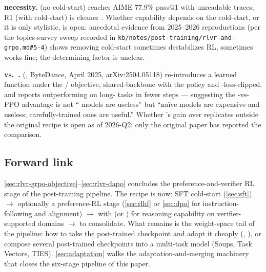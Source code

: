\begin{contradiction}
\textbf{ necessity.}  (no cold-start) reaches AIME
$77.9\%$ pass@1 with unreadable traces; R1 (with cold-start) is cleaner
\citep[\S 3]{deepseek-r1}. Whether capability depends on the
cold-start, or it is only stylistic, is open: anecdotal evidence
from 2025--2026 reproductions (per the topics-survey sweep recorded in
\nolinkurl{kb/notes/post-training/rlvr-and-grpo.md#5-4}) shows removing
cold-start sometimes destabilizes RL, sometimes works fine; the
determining factor is unclear.
\end{contradiction}

\begin{contradiction}
\textbf{ vs.\ .}  (, ByteDance, April
2025, arXiv:2504.05118) re-introduces a learned 
function under the / objective, shared-backbone with the
policy and -loss-clipped, and reports outperforming  on
long- tasks in fewer steps — suggesting the -vs-PPO advantage is
not `` models are useless'' but ``na\"ive  models are
expensive-and-useless; carefully-trained ones are useful.'' Whether
's gain over  replicates outside the original recipe is open as
of 2026-Q2; only the original paper has reported the comparison.
\end{contradiction}

\subsection{Forward link}
\label{sec:rlvr-forward}

\cref{sec:rlvr-grpo-objective}--\cref{sec:rlvr-dapo} concludes the
preference-and-verifier RL stage of the post-training pipeline.
The recipe is now: SFT cold-start (\cref{sec:sft})
$\to$ optionally a preference-RL stage (\cref{sec:rlhf} or
\cref{sec:dpo} for instruction-following and alignment)
$\to$  with  (or ) for reasoning capability on
verifier-supported domains $\to$  to consolidate.
What remains is the weight-space tail of the pipeline: how to take the
post-trained checkpoint and adapt it cheaply (, ), or compose
several post-trained checkpoints into a multi-task model (Soups, Task
Vectors, TIES). \cref{sec:adaptation} walks the adaptation-and-merging
machinery that closes the six-stage pipeline of this paper.
